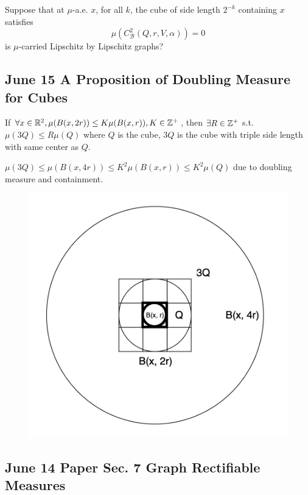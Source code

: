 \begin{problem}
    Suppose that at $\mu$-a.e. $x$, for all $k$, the cube of side length $2^{-k}$ containing $x$ satisfies
    $$
    \mu(C^2_\mathcal{B}(Q, r, V, \alpha)) = 0
    $$
    is $\mu$-carried Lipschitz by Lipschitz graphs?
\end{problem}

\newpage
\subsection{June 15 A Proposition of Doubling Measure for Cubes}

\begin{proposition}
    If $\forall x\in \mathbb{R}^2, \mu(B(x, 2r))\leq K\mu(B(x,r)), K\in\mathbb{Z}^+$, then $\exists R\in \mathbb{Z}^+$ s.t. $\mu(3Q)\leq R\mu(Q)$ where $Q$ is the cube, 3$Q$ is the cube with triple side length with same center as $Q$. 
\end{proposition}
\proof  $\mu(3Q) \leq \mu(B(x, 4r)) \leq K^2\mu(B(x, r))\leq K^2 \mu(Q)$ due to doubling measure and containment. 

\begin{figure}[H]
    \centering
    \includegraphics[width=.66\textwidth]{images/doubleMcube.png}
\end{figure}


\newpage
\subsection{June 14 Paper \texorpdfstring{\cite{naples2020}}{Lg} Sec. 7 Graph Rectifiable Measures}
